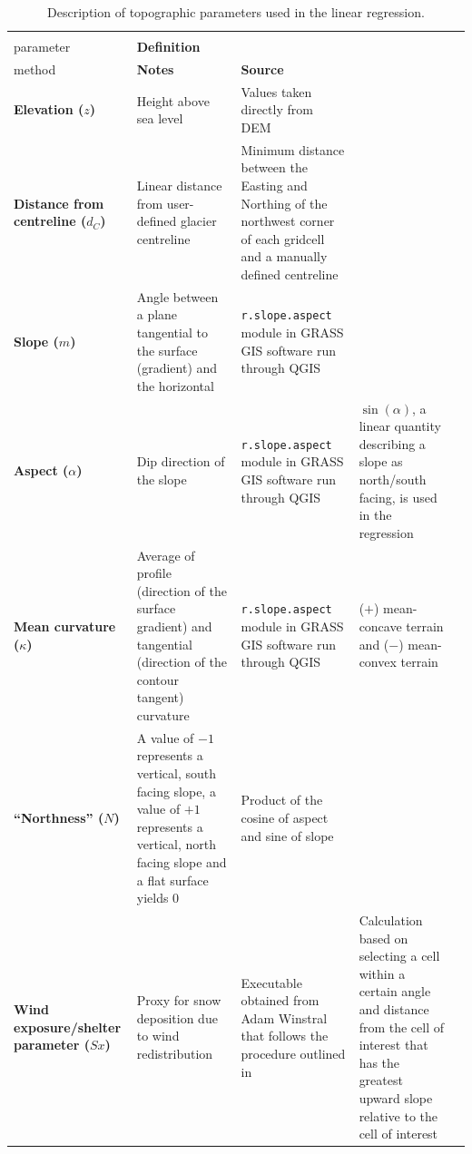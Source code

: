 \documentclass{sfuthesis}
\begin{document}
\begin{landscape}
\begin{table}
\footnotesize
\begin{threeparttable}
\caption{Description of topographic parameters used in the linear regression.}
\label{tab:TopoParams}
\begin{tabularx}{22cm}{XXXXX}
\midrule
\textbf{\begin{tabular}[c]{@{}l@{}}Topographic\\ parameter\end{tabular}} & \textbf{Definition} & \textbf{\begin{tabular}[c]{@{}l@{}}Calculation \\ method\end{tabular}} & \textbf{Notes} & \textbf{Source} \\ \midrule
\textbf{Elevation ($z$)} & Height above sea level & Values taken directly from DEM &  &  \\ \midrule
\textbf{Distance from centreline ($d_C$)} & Linear distance from user-defined glacier centreline & Minimum distance between the Easting and Northing of the northwest corner of each gridcell and a manually defined centreline &  &  \\ \midrule
\textbf{Slope ($m$)} & Angle between a plane tangential to the surface (gradient) and the horizontal & \texttt{r.slope.aspect} module in GRASS GIS software run through QGIS &  & \cite{Mitavsova1993, Hofierka2009, Olaya2009} \\ \midrule
\textbf{Aspect ($\alpha$)} & Dip direction of the slope & \texttt{r.slope.aspect} module in GRASS GIS software run through QGIS & $\sin(\alpha)$, a linear quantity describing a slope as north/south facing, is used in the regression & \cite{Mitavsova1993, Hofierka2009, Olaya2009} \\ \midrule
\textbf{Mean curvature ($\kappa$)} & Average of profile (direction of the surface gradient) and tangential (direction of the contour tangent) curvature & \texttt{r.slope.aspect} module in GRASS GIS software run through QGIS & ($+$) mean-concave terrain and ($-$) mean-convex terrain & \cite{Mitavsova1993, Hofierka2009, Olaya2009} \\ \midrule
\textbf{``Northness'' ($N$)} & A value of $-1$ represents a vertical, south facing slope, a value of $+1$ represents a vertical, north facing slope and a flat surface yields 0 & Product of the cosine of aspect and sine of slope &  & \citep{Molotch2005} \\ \midrule
\textbf{Wind exposure/shelter parameter ($Sx$)} & Proxy for snow deposition due to wind redistribution & Executable obtained from Adam Winstral that follows the procedure outlined in \cite{Winstral2002} & Calculation based on selecting a cell within a certain angle and distance from the cell of interest that has the greatest upward slope relative to the cell of interest & \citep{Winstral2002}
\end{tabularx}
\end{threeparttable}
\end{table}
\end{landscape}
\end{document}
